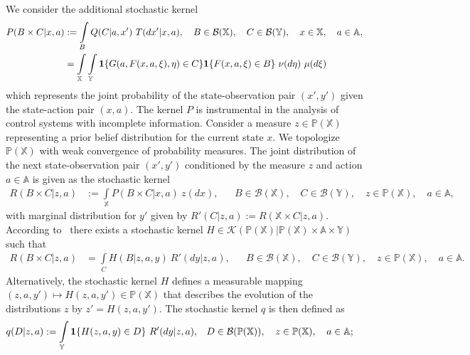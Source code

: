 \documentclass[11pt,onecolumn]{IEEEtran}  %
\newcommand{\Ab}{\mathbb{A}}
\newcommand{\Pb}{\mathbb{P}}
\newcommand{\Xb}{\mathbb{X}}
\newcommand{\Yb}{\mathbb{Y}}
\newcommand{\Bc}{\mathcal{B}}
\newcommand{\Kc}{\mathcal{K}}
\newcommand{\one}[1]{\mathbf{1}\set{#1}}
\newcommand{\defeq}{:=}%
\DeclarePairedDelimiter{\set}{\{}{\}}
\theoremstyle{definition}
\begin{document}
We consider the additional stochastic kernel
\begin{align}\label{eq:joint_kernel}
    P(B \times C | x,a) &\defeq
    \int\limits_{B} Q(C|a,x') \ T(dx'|x,a), \quad
    B \in \Bc(\Xb), \quad
    C \in \Bc(\Yb), \quad
    x \in \Xb, \quad
    a \in \Ab, \\
    &=\int\limits_{\Xb}\int\limits_{\Yb} \one{G(a,F(x,a,\xi),\eta) \in C} \one{F(x,a,\xi)\in B} \ \nu(d\eta) \ \mu(d\xi) \label{eq:new}
\end{align}
which represents the joint probability of the state-observation pair $(x', y')$ given the state-action pair $(x, a)$. The kernel $P$ is instrumental in the analysis of control systems with incomplete information. Consider a measure $z \in \Pb(\Xb)$ representing a prior belief distribution for the current state $x$. We topologize $\Pb(\Xb)$ with weak convergence of probability measures. The joint distribution of the next state-observation pair $(x', y')$ conditioned by the measure $z$ and action $a \in \Ab$ is given as the stochastic kernel
\begin{align*}
    R(B \times C | z,a) &\defeq
    \int\limits_{\Xb} P(B \times C | x,a) \ z(dx), &&
    B \in \Bc(\Xb), \quad
    C \in \Bc(\Yb), \quad
    z \in \Pb(\Xb), \quad
    a \in \Ab,
\end{align*}
with marginal distribution for $y'$ given by $R'(C |z,a) \defeq R(\Xb \times C | z,a)$. According to~\citet[Proposition 7.27]{bertsekas_stochastic_1996} there exists a stochastic kernel $H \in \Kc(\Pb(\Xb) | \Pb(\Xb) \times \Ab \times \Yb)$ such that
\begin{align*}
    R(B \times C | z, a) &=
    \int\limits_C H(B|z,a,y) \ R'(dy|z,a), &&
    B \in \Bc(\Xb), \quad
    C \in \Bc(\Yb), \quad
    z \in \Pb(\Xb), \quad
    a \in \Ab.
\end{align*}
Alternatively, the stochastic kernel $H$ defines a measurable mapping $(z,a,y') \mapsto H(z,a,y') \in \Pb(\Xb)$ that describes the evolution of the distributions $z$ by $z'= H(z, a, y')$. The stochastic kernel $q$ is then defined as
\begin{align} \label{eq:comdp_kernel_Rn}
    q(D |z, a) &\defeq
    \int\limits_{\Yb} \one{H(z, a, y) \in D} \ R^{\prime}(dy |z, a), &&
    D \in \Bc(\Pb(\Xb)), \quad
    z \in \Pb(\Xb), \quad
    a \in \Ab;
\end{align}
\end{document}
